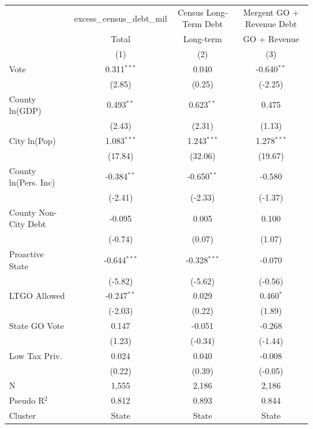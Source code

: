 \begingroup
\centering
\begin{tabular*}{\textwidth}{@{\extracolsep{\fill}}lccc}
   \toprule
                        & excess\_census\_debt\_mil    & Census Long-Term Debt & Mergent GO + Revenue Debt\\  
                        & Total                        & Long-term             & GO + Revenue \\   
                        & (1)                          & (2)                   & (3)\\  
   \midrule 
   Vote                 & 0.311$^{***}$                & 0.040                 & -0.640$^{**}$\\   
                        & (2.85)                      & (0.25)               & (-2.25)\\   
   County ln(GDP)       & 0.493$^{**}$                 & 0.623$^{**}$          & 0.475\\   
                        & (2.43)                      & (2.31)               & (1.13)\\   
   City ln(Pop)         & 1.083$^{***}$                & 1.243$^{***}$         & 1.278$^{***}$\\   
                        & (17.84)                     & (32.06)              & (19.67)\\   
   County ln(Pers. Inc) & -0.384$^{**}$                & -0.650$^{**}$         & -0.580\\   
                        & (-2.41)                     & (-2.33)              & (-1.37)\\   
   County Non-City Debt & -0.095                       & 0.005                 & 0.100\\   
                        & (-0.74)                     & (0.07)               & (1.07)\\   
   Proactive State      & -0.644$^{***}$               & -0.328$^{***}$        & -0.070\\   
                        & (-5.82)                     & (-5.62)              & (-0.56)\\   
   LTGO Allowed         & -0.247$^{**}$                & 0.029                 & 0.460$^{*}$\\   
                        & (-2.03)                     & (0.22)               & (1.89)\\   
   State GO Vote        & 0.147                        & -0.051                & -0.268\\   
                        & (1.23)                      & (-0.34)              & (-1.44)\\   
   Low Tax Priv.        & 0.024                        & 0.040                 & -0.008\\   
                        & (0.22)                      & (0.39)               & (-0.05)\\   
   \hline
   N         & 1,555                        & 2,186                 & 2,186\\  
   Pseudo R$^2$         & 0.812                        & 0.893                 & 0.844\\  
   Cluster              & State & State & State\\  
   \bottomrule
\end{tabular*}
\par\endgroup
